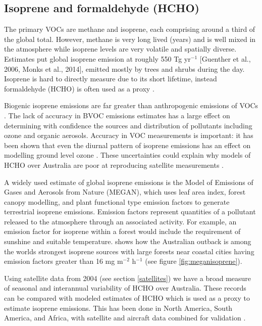\subsection{Isoprene and formaldehyde (HCHO)}
\label{proxy}
The primary VOCs are methane and isoprene, each comprising around a third of the global total.
However, methane is very long lived (years) and is well mixed in the atmosphere while isoprene levels are very volatile and spatially diverse. Estimates put global isoprene emission at roughly 550 Tg yr$^{−1}$ [Guenther et al., 2006, Monks et al., 2014], emitted mostly by trees and shrubs during the day.
Isoprene is hard to directly measure due to its short lifetime, instead formaldehyde (HCHO) is often used as a proxy \cite{Marais_2012,bauwens2013satellite}.

Biogenic isoprene emissions are far greater than anthropogenic emissions of VOCs \cite{Guenther_2006}. 
The lack of accuracy in BVOC emissions estimates has a large effect on determining with confidence the sources and distribution of pollutants including ozone and organic aerosols.
Accuracy in VOC measurements is important: it has been shown that even the diurnal pattern of isoprene emissions has an effect on modelling ground level ozone \cite{Hewitt_2011,Fan_2004}.
These uncertainties could explain why models of HCHO over Australia are poor at reproducing satellite measurements \cite{Stavrakou_2008}.

A widely used estimate of global isoprene emissions is the Model of Emissions of Gases and Aerosols from Nature (MEGAN), which uses leaf area index, forest canopy modelling, and plant functional type emission factors to generate terrestrial isoprene emissions.
Emission factors represent quantities of a pollutant released to the atmosphere through an associated activity.
For example, an emission factor for isoprene within a forest would include the requirement of sunshine and suitable temperature.
\citet{Guenther_2006} shows how the Australian outback is among the worlds strongest isoprene sources with large forests near coastal cities having emission factors greater than 16 mg m$^{-2}$ h$^{-1}$ (see figure \ref{fig:meganisoprene}).

Using satellite data from 2004 (see section \ref{satellites}) we have a broad measure of seasonal and interannual variability of HCHO over Australia.
These records can be compared with modeled estimates of HCHO which is used as a proxy to estimate isoprene emissions.
This has been done in North America, South America, and Africa, with satellite and aircraft data combined for validation \cite{Millet_2006, Marais_2014}.

